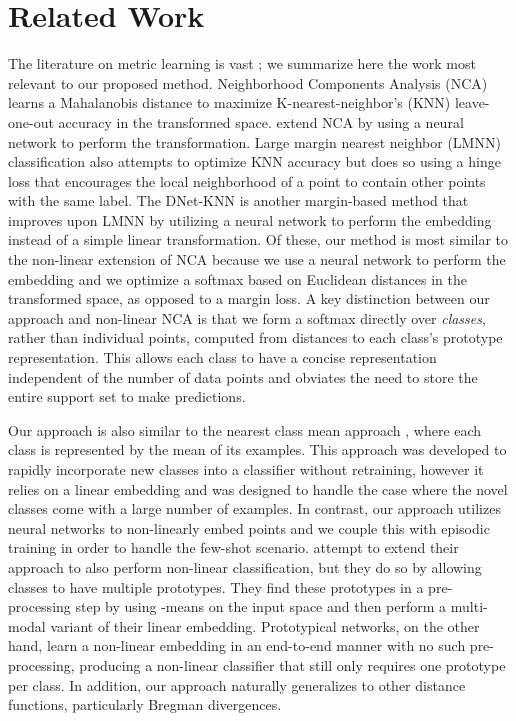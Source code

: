 \documentclass{article}
\begin{document}
\section{Related Work}
The literature on metric learning is vast \citep{kulis2012metric,bellet2013survey}; we summarize here the work most relevant to our proposed method. Neighborhood Components Analysis (NCA) \citep{goldberger2004neighbourhood} learns a Mahalanobis distance to maximize K-nearest-neighbor's (KNN) leave-one-out accuracy in the transformed space. 
\citet{salakhutdinov2007learning} extend NCA by using a neural network to perform the transformation. Large margin nearest neighbor (LMNN) classification \citep{weinberger2005distance} also attempts to optimize KNN accuracy but does so using a hinge loss that encourages the local neighborhood of a point to contain other points with the same label. The DNet-KNN \citep{min2009deep} is another margin-based method that improves upon LMNN by utilizing a neural network to perform the embedding instead of a simple linear transformation. Of these, our method is most similar to the non-linear extension of NCA \citep{salakhutdinov2007learning} because we use a neural network to perform the embedding and we optimize a softmax based on Euclidean distances in the transformed space, as opposed to a margin loss. A key distinction between our approach and non-linear NCA is that we form a softmax directly over \emph{classes}, rather than individual points, computed from distances to each class's prototype representation. This allows each class to have a concise representation independent of the number of data points and obviates the need to store the entire support set to make predictions.

Our approach is also similar to the nearest class mean approach \citep{mensink2013distance}, where each class is represented by the mean of its examples. 
This approach was developed to rapidly incorporate new classes into a classifier without retraining, however it relies on a linear embedding and was designed to handle the case where the novel classes come with a large number of examples. In contrast, our approach utilizes neural networks to non-linearly embed points and we couple this with episodic training in order to handle the few-shot scenario. \citeauthor{mensink2013distance} attempt to extend their approach to also perform non-linear classification, but they do so by allowing classes to have multiple prototypes. They find these prototypes in a pre-processing step by using -means on the input space and then perform a multi-modal variant of their linear embedding. Prototypical networks, on the other hand, learn a non-linear embedding in an end-to-end manner with no such pre-processing, producing a non-linear classifier that still only requires one prototype per class. In addition, our approach naturally generalizes to other distance functions, particularly Bregman divergences.
\end{document}
